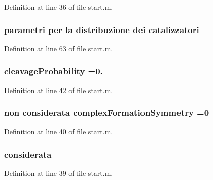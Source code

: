 Definition at line 36 of file start.\-m.

\hypertarget{a00113_a5a2da1d1b50e51c66813f40da0d9d0d1}{
\subsubsection[{catalizzatori}]{\setlength{\rightskip}{0pt plus 5cm}parametri per la distribuzione dei catalizzatori}}\label{a00113_a5a2da1d1b50e51c66813f40da0d9d0d1}


Definition at line 63 of file start.\-m.

\hypertarget{a00113_a9d512df05ee559766d2b8f08e4704b04}{
\subsubsection[{cleavage\-Probability}]{\setlength{\rightskip}{0pt plus 5cm}cleavage\-Probability =0.}}\label{a00113_a9d512df05ee559766d2b8f08e4704b04}


Definition at line 42 of file start.\-m.

\hypertarget{a00113_ac5d9cfec5453da5efc3e8d574b455833}{
\subsubsection[{complex\-Formation\-Symmetry}]{ non {\bf considerata} complex\-Formation\-Symmetry =0}}\label{a00113_ac5d9cfec5453da5efc3e8d574b455833}


Definition at line 40 of file start.\-m.

\hypertarget{a00113_ad76697f83c5d8bf201c45822af227e21}{
\subsubsection[{considerata}]{ considerata}}\label{a00113_ad76697f83c5d8bf201c45822af227e21}


Definition at line 39 of file start.\-m.

